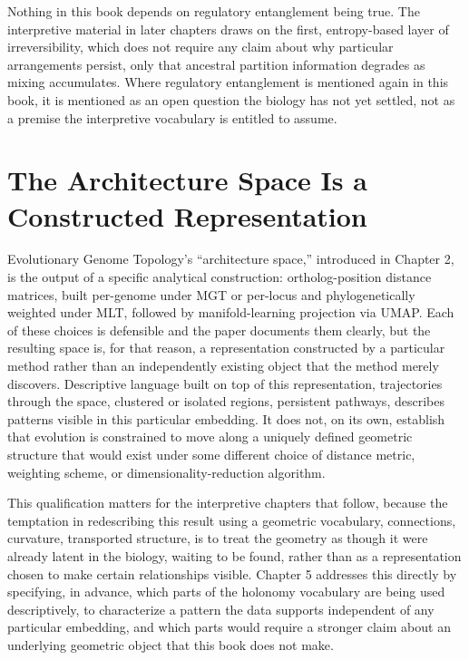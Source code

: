 \documentclass[11pt]{book}
\begin{document}
Nothing in this book depends on regulatory entanglement being true. The interpretive material in later chapters draws on the first, entropy-based layer of irreversibility, which does not require any claim about why particular arrangements persist, only that ancestral partition information degrades as mixing accumulates. Where regulatory entanglement is mentioned again in this book, it is mentioned as an open question the biology has not yet settled, not as a premise the interpretive vocabulary is entitled to assume.

\section{The Architecture Space Is a Constructed Representation}

Evolutionary Genome Topology's ``architecture space,'' introduced in Chapter 2, is the output of a specific analytical construction: ortholog-position distance matrices, built per-genome under MGT or per-locus and phylogenetically weighted under MLT, followed by manifold-learning projection via UMAP. Each of these choices is defensible and the paper documents them clearly, but the resulting space is, for that reason, a representation constructed by a particular method rather than an independently existing object that the method merely discovers. Descriptive language built on top of this representation, trajectories through the space, clustered or isolated regions, persistent pathways, describes patterns visible in this particular embedding. It does not, on its own, establish that evolution is constrained to move along a uniquely defined geometric structure that would exist under some different choice of distance metric, weighting scheme, or dimensionality-reduction algorithm.

This qualification matters for the interpretive chapters that follow, because the temptation in redescribing this result using a geometric vocabulary, connections, curvature, transported structure, is to treat the geometry as though it were already latent in the biology, waiting to be found, rather than as a representation chosen to make certain relationships visible. Chapter 5 addresses this directly by specifying, in advance, which parts of the holonomy vocabulary are being used descriptively, to characterize a pattern the data supports independent of any particular embedding, and which parts would require a stronger claim about an underlying geometric object that this book does not make.
\end{document}
